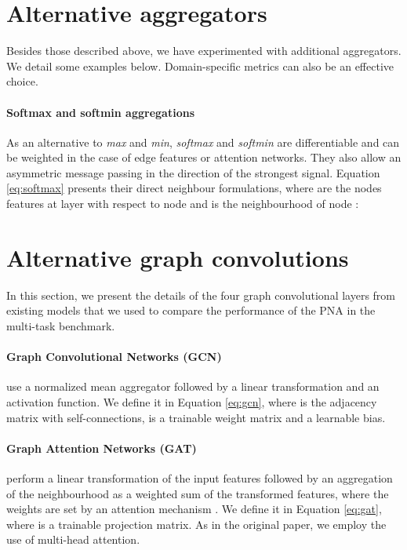 \documentclass{article}
\begin{document}
\pagebreak

\section{Alternative aggregators}
\label{app:aggregators}

Besides those described above, we have experimented with additional aggregators. We detail some examples below. Domain-specific metrics can also be an effective choice.

\paragraph{Softmax and softmin aggregations}
As an alternative to \textit{max} and \textit{min}, \textit{softmax} and \textit{softmin} are differentiable and can be weighted in the case of edge features or attention networks. They also allow an asymmetric message passing in the direction of the strongest signal. Equation \ref{eq:softmax} presents their direct neighbour formulations, where  are the nodes features at layer  with respect to node  and  is the neighbourhood of node :




\section{Alternative graph convolutions}
\label{app:convolutions}

In this section, we present the details of the four graph convolutional layers from existing models that we used to compare the performance of the PNA in the multi-task benchmark.

\paragraph{Graph Convolutional Networks (GCN)} \cite{kipf2016gcn} use a normalized mean aggregator followed by a linear transformation and an activation function. We define it in Equation \ref{eq:gcn}, where  is the adjacency matrix with self-connections,  is a trainable weight matrix and  a learnable bias.



\paragraph{Graph Attention Networks (GAT)} \cite{velikovic2017gat} perform a linear transformation of the input features followed by an aggregation of the neighbourhood as a weighted sum of the transformed features, where the weights are set by an attention mechanism . We define it in Equation \ref{eq:gat}, where  is a trainable projection matrix. As in the original paper, we employ the use of multi-head attention.
\end{document}
